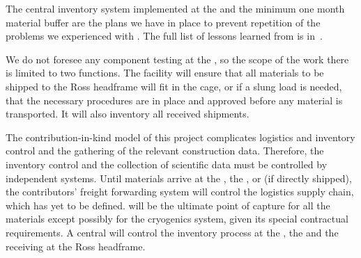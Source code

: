 The central inventory system  implemented at the   and the minimum one month material buffer are the plans we have in place to prevent repetition of the problems we experienced with .   The full list of lessons learned from  is in~\cite{bib:docdb8255}. 

We do not foresee any component testing at the , %
so the scope of the  work there is limited to two functions. %
The facility will ensure that all materials to be shipped to the Ross headframe will fit in the cage, or %
if a slung load is needed, %
that the necessary procedures are in place and approved before any material is transported. %
It will also %
inventory all received shipments. %


The contribution-in-kind model of this project complicates logistics and inventory control and the gathering of the relevant construction data. Therefore, the inventory control and the collection of scientific data 
 must be controlled by independent systems. 
Until materials arrive at the , the , or  (if directly shipped), the contributors' freight forwarding system will control the logistics supply chain, which has yet to be defined.   will be the ultimate point of capture for all the materials except possibly for the cryogenics system, given its special contractual requirements. A central  will control the inventory process at the , the  and the  receiving at the Ross headframe. 


